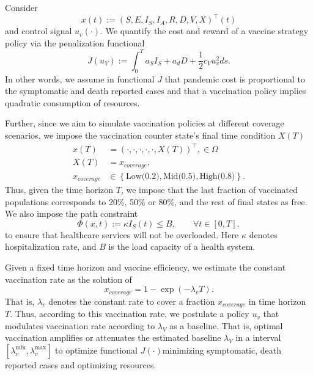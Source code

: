\documentclass[preprint, sort&compress]{elsarticle}
\begin{document}
Consider
  {$${x(t):= (S,E,I_S,I_A,R,D,V,X)^{\top}(t)}$$} and control signal
  $u_v(\cdot)$. We quantify the cost and reward of a vaccine strategy 
  policy via the penalization functional
  \begin{equation}
    \label{eqn:cost_functional}
    J(u_V):=
      \int _0 ^ T
      a_S I_S + a_d D +
      \frac{1}{2}
c_V u_v^2
ds.
  \end{equation}
  In other words, we assume in functional $J$ that pandemic cost is proportional to the
  symptomatic and death reported cases and that a vaccination policy
  implies quadratic consumption of resources.

  Further, since we aim to simulate vaccination policies at different coverage
  scenarios, we impose the vaccination counter state's final
  time condition $X(T)$
  \begin{equation}
    \begin{aligned}
      x(T) &= (\cdot, \cdot, \cdot, \cdot, \cdot, X(T))^{\top},
      \in \Omega
      \\
      X(T)
        &= x_{cover age},
      \\
      x_{coverage}
        & \in
        \left \{
          \text{Low(0.2)},\text{Mid(0.5)}, \text{High(0.8)}
        \right \} .
    \end{aligned}
  \end{equation}
  Thus, given the time horizon $T$, we impose that the last fraction of
  vaccinated populations corresponds to 20\%, 50\% or 80\%, and
  the rest of final states as free. We also impose the path constraint
  \begin{equation}
    \label{eqn:path_constrain}
    \Phi(x,t):= \kappa I_S(t) \leq B,
    \qquad \forall t \in [0, T],
  \end{equation}
  to ensure that healthcare services will not be overloaded. Here $\kappa$
  denotes hospitalization rate, and $B$ is the load capacity of a
  health system.

Given a fixed time horizon and vaccine efficiency, 
we estimate the constant vaccination rate as the solution of
\begin{equation}
    x_{coverage} = 1 - \exp(-\lambda_v T).
\end{equation}
 That is, $\lambda_v$ denotes the constant rate
to cover  a fraction $x_{coverage}$ in time horizon $T$. 
Thus, according to this vaccination rate, we postulate a policy $u_v$ that 
modulates vaccination rate according to $\lambda_V$ as a baseline. That is,
optimal vaccination amplifies or attenuates the estimated baseline 
$\lambda_V$ in a interval $[\lambda_v^{\min}, \lambda_v^{\max}]$ 
to optimize functional $J(\cdot)$\textemdash minimizing 
symptomatic, death reported cases and optimizing resources.
\end{document}
